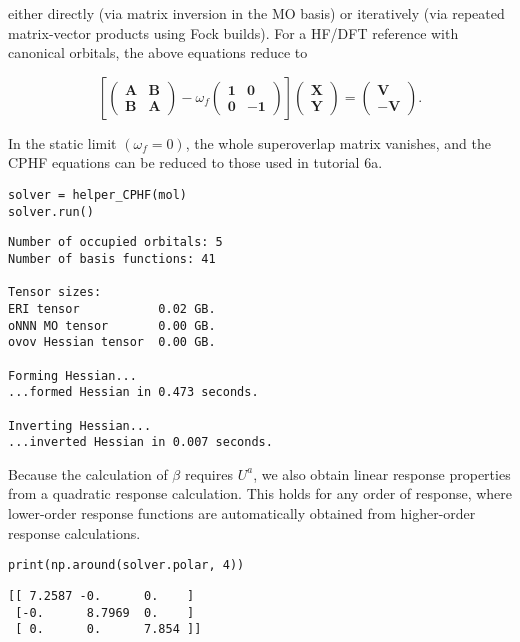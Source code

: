 \documentclass[]{article}
\begin{document}
either directly (via matrix inversion in the MO basis) or iteratively
(via repeated matrix-vector products using Fock builds). For a HF/DFT
reference with canonical orbitals, the above equations reduce to

\[
\left[
\begin{pmatrix}
\mathbf{A} & \mathbf{B} \\ 
\mathbf{B} & \mathbf{A}
\end{pmatrix}
- \omega_{f}
\begin{pmatrix}
\mathbf{1} & \mathbf{0} \\ 
\mathbf{0} & -\mathbf{1}
\end{pmatrix}
\right]
\begin{pmatrix}
\mathbf{X} \\ 
\mathbf{Y}
\end{pmatrix}
=
\begin{pmatrix}
\mathbf{V} \\ 
-\mathbf{V}
\end{pmatrix}
.
\]

In the static limit \((\omega_f = 0)\), the whole superoverlap matrix
vanishes, and the CPHF equations can be reduced to those used in
tutorial 6a.

\begin{verbatim}
solver = helper_CPHF(mol)
solver.run()
\end{verbatim}

\begin{verbatim}
Number of occupied orbitals: 5
Number of basis functions: 41

Tensor sizes:
ERI tensor           0.02 GB.
oNNN MO tensor       0.00 GB.
ovov Hessian tensor  0.00 GB.

Forming Hessian...
...formed Hessian in 0.473 seconds.

Inverting Hessian...
...inverted Hessian in 0.007 seconds.
\end{verbatim}

Because the calculation of \(\beta\) requires \(U^{a}\), we also obtain
linear response properties from a quadratic response calculation. This
holds for any order of response, where lower-order response functions
are automatically obtained from higher-order response calculations.

\begin{verbatim}
print(np.around(solver.polar, 4))
\end{verbatim}

\begin{verbatim}
[[ 7.2587 -0.      0.    ]
 [-0.      8.7969  0.    ]
 [ 0.      0.      7.854 ]]
\end{verbatim}
\end{document}

